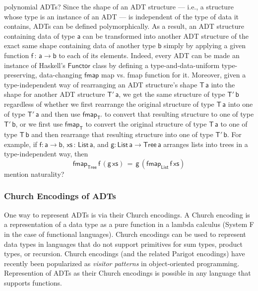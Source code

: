 \documentclass[acmsmall,screen,review,anonymous]{acmart}
\theoremstyle{definition}
\begin{document}
{\color{blue} polynomial ADTs?} Since the shape of an ADT structure
--- i.e., a structure whose type is an instance of an ADT --- is
independent of the type of data it contains, ADTs can be defined
polymorphically. As a result, an ADT structure containing data of type
$\mathsf{a}$ can be transformed into another ADT structure of the
exact same shape containing data of another type $\mathsf{b}$ simply
by applying a given function $\mathsf{f \,:\,a \to b}$ to each of its
elements. Indeed, every ADT can be made an instance of Haskell's
$\mathsf{Functor}$ class by defining a type-and-data-uniform
type-preserving, data-changing $\mathsf{fmap}$ {\color{blue} map
  vs. fmap} function for it.  Moreover, given a type-independent way
of rearranging an ADT structure's shape $\mathsf{T\,a}$ into the shape
for another ADT structure $\mathsf{T'\,a}$, we get the same structure
of type $\mathsf{T'\,b}$ regardless of whether we first rearrange the
original structure of type $\mathsf{T\,a}$ into one of type
$\mathsf{T'\,a}$ and then use $\mathsf{fmap_{T'}}$ to convert that
resulting structure to one of type $\mathsf{T'\,b}$, or we first use
$\mathsf{fmap_T}$ to convert the original structure of type
$\mathsf{T\,a}$ to one of type $\mathsf{T\,b}$ and then rearrange that
resulting structure into one of type $\mathsf{T'\,b}$. For example, if
$\mathsf{f : a \to b}$, $\mathsf{xs \,:\,List\,a}$, and $\mathsf{g :
  List\,a\to Tree\,a}$ arranges lists into trees in a type-independent
way, then
\[\mathsf{fmap_{Tree}\,f\,(g \, xs) \,=\, g\,(fmap_{List}\,f\,xs)}\]
{\color{violet} mention naturality?}

\subsubsection{Church Encodings of ADTs}

One way to represent ADTs is via their Church encodings. A Church
encoding is a representation of a data type as a pure function in a
lambda calculus (System F in the case of functional languages). Church
encodings can be used to represent data types in languages that do not
support primitives for sum types, product types, or recursion.
{\color{blue} Church encodings (and the related Parigot encodings)
  have recently been popularized as {\em visitor patterns} in
  object-oriented programming.} Represention of ADTs as their Church
encodings is possible in any language that supports functions.
\end{document}

